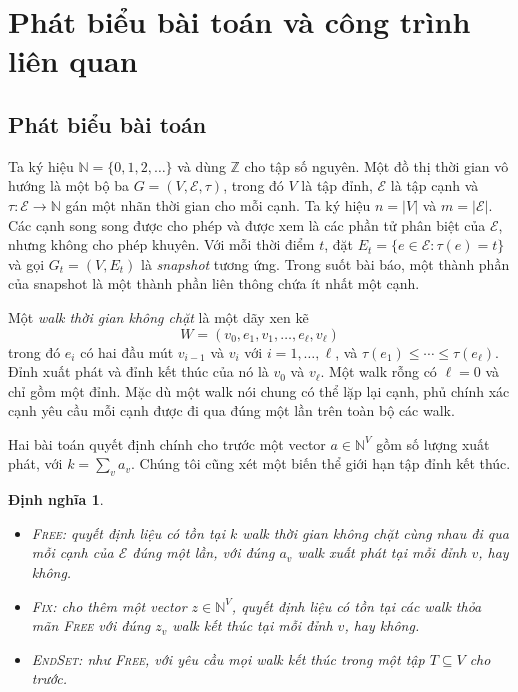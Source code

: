 \documentclass[pdflatex,sn-mathphys-num]{sn-jnl}
\theoremstyle{thmstyleone}%
\theoremstyle{thmstyletwo}%
\theoremstyle{thmstylethree}%
\newtheorem{definition}{Định nghĩa}%
\newcommand{\N}{\mathbb{N}}
\newcommand{\Z}{\mathbb{Z}}
\newcommand{\cE}{\mathcal{E}}
\newcommand{\FIX}{\textup{\textsc{Fix}}}
\newcommand{\FREE}{\textup{\textsc{Free}}}
\newcommand{\ENDSET}{\textup{\textsc{EndSet}}}
\newcommand{\abs}[1]{\lvert #1\rvert}
\begin{document}
\section{Phát biểu bài toán và công trình liên quan}\label{sec:prelim}

\subsection{Phát biểu bài toán}\label{sec:problem}

Ta ký hiệu $\N=\{0,1,2,\ldots\}$ và dùng $\Z$ cho tập số nguyên. Một đồ thị thời gian vô hướng là một bộ ba $G=(V,\cE,\tau)$, trong đó $V$ là tập đỉnh, $\cE$ là tập cạnh và $\tau:\cE\to\N$ gán một nhãn thời gian cho mỗi cạnh. Ta ký hiệu $n=\abs{V}$ và $m=\abs{\cE}$. Các cạnh song song được cho phép và được xem là các phần tử phân biệt của $\cE$, nhưng không cho phép khuyên. Với mỗi thời điểm $t$, đặt $E_t=\{e\in\cE:\tau(e)=t\}$ và gọi $G_t=(V,E_t)$ là \emph{snapshot} tương ứng. Trong suốt bài báo, một thành phần của snapshot là một thành phần liên thông chứa ít nhất một cạnh.

Một \emph{walk thời gian không chặt} là một dãy xen kẽ
\[
  W=(v_0,e_1,v_1,\ldots,e_\ell,v_\ell)
\]
trong đó $e_i$ có hai đầu mút $v_{i-1}$ và $v_i$ với $i=1,\ldots,\ell$, và $\tau(e_1)\le\cdots\le\tau(e_\ell)$. Đỉnh xuất phát và đỉnh kết thúc của nó là $v_0$ và $v_\ell$. Một walk rỗng có $\ell=0$ và chỉ gồm một đỉnh. Mặc dù một walk nói chung có thể lặp lại cạnh, phủ chính xác cạnh yêu cầu mỗi cạnh được đi qua đúng một lần trên toàn bộ các walk.

Hai bài toán quyết định chính cho trước một vector $a\in\N^V$ gồm số lượng xuất phát, với $k=\sum_v a_v$. Chúng tôi cũng xét một biến thể giới hạn tập đỉnh kết thúc.

\begin{definition}\label{def:problems}
\begin{itemize}
\item \FREE{}: quyết định liệu có tồn tại $k$ walk thời gian không chặt cùng nhau đi qua mỗi cạnh của $\cE$ đúng một lần, với đúng $a_v$ walk xuất phát tại mỗi đỉnh $v$, hay không.
\item \FIX{}: cho thêm một vector $z\in\N^V$, quyết định liệu có tồn tại các walk thỏa mãn \FREE{} với đúng $z_v$ walk kết thúc tại mỗi đỉnh $v$, hay không.
\item \ENDSET{}: như \FREE{}, với yêu cầu mọi walk kết thúc trong một tập $T\subseteq V$ cho trước.
\end{itemize}
\end{definition}
\end{document}

